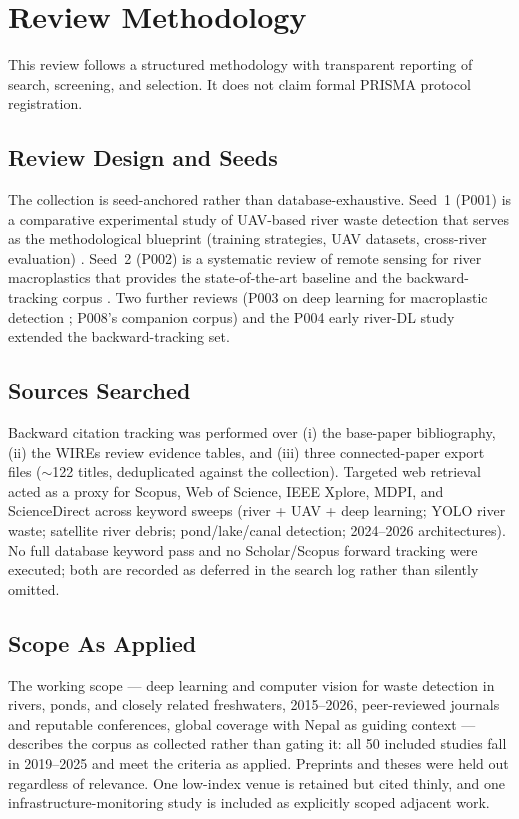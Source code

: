 \documentclass[12pt]{article}
\begin{document}
\section{Review Methodology}
\label{sec:methodology}

This review follows a structured methodology with transparent reporting of search, screening, and selection. It does not claim formal PRISMA protocol registration.

\subsection{Review Design and Seeds}
The collection is seed-anchored rather than database-exhaustive. Seed~1 (P001) is a comparative experimental study of UAV-based river waste detection that serves as the methodological blueprint (training strategies, UAV datasets, cross-river evaluation) \cite{Pati2025}. Seed~2 (P002) is a systematic review of remote sensing for river macroplastics that provides the state-of-the-art baseline and the backward-tracking corpus \cite{Marye2025}. Two further reviews (P003 on deep learning for macroplastic detection \cite{Jia2023}; P008's companion corpus) and the P004 early river-DL study \cite{Jakovljevic2020} extended the backward-tracking set.

\subsection{Sources Searched}
Backward citation tracking was performed over (i) the base-paper bibliography, (ii) the WIREs review evidence tables, and (iii) three connected-paper export files ($\sim$122 titles, deduplicated against the collection). Targeted web retrieval acted as a proxy for Scopus, Web of Science, IEEE Xplore, MDPI, and ScienceDirect across keyword sweeps (river + UAV + deep learning; YOLO river waste; satellite river debris; pond/lake/canal detection; 2024--2026 architectures). No full database keyword pass and no Scholar/Scopus forward tracking were executed; both are recorded as deferred in the search log rather than silently omitted.

\subsection{Scope As Applied}
The working scope --- deep learning and computer vision for waste detection in rivers, ponds, and closely related freshwaters, 2015--2026, peer-reviewed journals and reputable conferences, global coverage with Nepal as guiding context --- describes the corpus as collected rather than gating it: all 50 included studies fall in 2019--2025 and meet the criteria as applied. Preprints and theses were held out regardless of relevance. One low-index venue is retained but cited thinly, and one infrastructure-monitoring study is included as explicitly scoped adjacent work.
\end{document}
